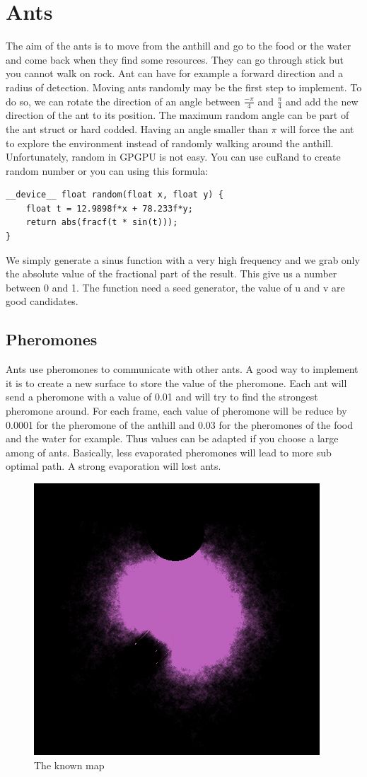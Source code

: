 \documentclass{article}
\begin{document}
\section{Ants}
The aim of the ants is to move from the anthill and go to the food or the water and come back when they find some resources. They can go through stick but you cannot walk on rock. Ant can have for example a forward direction and a radius of detection. Moving ants randomly may be the first step to implement. To do so, we can rotate the direction of an angle between $\frac{-\pi}{4}$ and $\frac{\pi}{4}$ and add the new direction of the ant to its position. The maximum random angle can be part of the ant struct or hard codded. Having an angle smaller than $\pi$ will force the ant to explore the environment instead of randomly walking around the anthill. Unfortunately, random in GPGPU is not easy. You can use cuRand to create random number or you can using this formula:
\begin{lstlisting}
__device__ float random(float x, float y) {
	float t = 12.9898f*x + 78.233f*y;
	return abs(fracf(t * sin(t)));
}
\end{lstlisting}
We simply generate a sinus function with a very high frequency and we grab only the absolute value of the fractional part of the result. This give us a number between 0 and 1. The function need a seed generator, the value of u and v are good candidates.

\subsection{Pheromones}
Ants use pheromones to communicate with other ants. A good way to implement it is to create a new surface to store the value of the pheromone. Each ant will send a pheromone with a value of 0.01 and will try to find the strongest pheromone around. For each frame, each value of pheromone will be reduce by 0.0001 for the pheromone of the anthill and 0.03 for the pheromones of the food and the water for example. Thus values can be adapted if you choose a large among of ants. Basically, less evaporated pheromones will lead to more sub optimal path. A strong evaporation will lost ants.
\begin{figure}[H]
	\centering
	\includegraphics[scale=0.7]{figures/know.png}
	\caption{The known map}
\end{figure}
\end{document}
